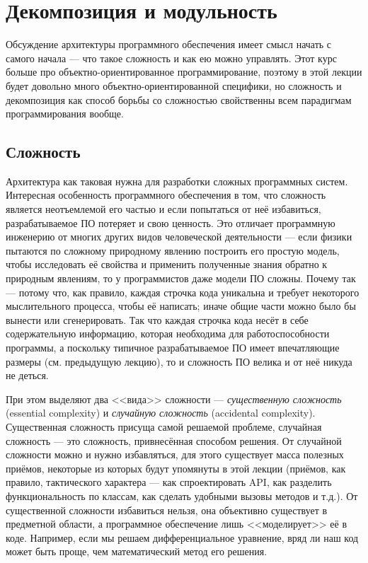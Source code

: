 \documentclass{../../text-style}
\begin{document}
\maketitle
\thispagestyle{empty}

\section{Декомпозиция и модульность}


Обсуждение архитектуры программного обеспечения имеет смысл начать с самого начала --- что такое сложность и как ею можно управлять. Этот курс больше про объектно-ориентированное программирование, поэтому в этой лекции будет довольно много объектно-ориентированной специфики, но сложность и декомпозиция как способ борьбы со сложностью свойственны всем парадигмам программирования вообще.

\subsection{Сложность}

Архитектура как таковая нужна для разработки сложных программных систем. Интересная особенность программного обеспечения в том, что сложность является неотъемлемой его частью и если попытаться от неё избавиться, разрабатываемое ПО потеряет и свою ценность. Это отличает программную инженерию от многих других видов человеческой деятельности --- если физики пытаются по сложному природному явлению построить его простую модель, чтобы исследовать её свойства и применить полученные знания обратно к природным явлениям, то у программистов даже модели ПО сложны. Почему так --- потому что, как правило, каждая строчка кода уникальна и требует некоторого мыслительного процесса, чтобы её написать; иначе общие части можно было бы вынести или сгенерировать. Так что каждая строчка кода несёт в себе содержательную информацию, которая необходима для работоспособности программы, а поскольку типичное разрабатываемое ПО имеет впечатляющие размеры (см. предыдущую лекцию), то и сложность ПО велика и от неё никуда не деться.

При этом выделяют два <<вида>> сложности --- \textit{существенную сложность} (essential complexity) и \textit{случайную сложность} (accidental complexity). Существенная сложность присуща самой решаемой проблеме, случайная сложность --- это сложность, привнесённая способом решения. От случайной сложности можно и нужно избавляться, для этого существует масса полезных приёмов, некоторые из которых будут упомянуты в этой лекции (приёмов, как правило, тактического характера --- как спроектировать API, как разделить функциональность по классам, как сделать удобными вызовы методов и т.д.). От существенной сложности избавиться нельзя, она объективно существует в предметной области, а программное обеспечение лишь <<моделирует>> её в коде. Например, если мы решаем дифференциальное уравнение, вряд ли наш код может быть проще, чем математический метод его решения.
\end{document}
